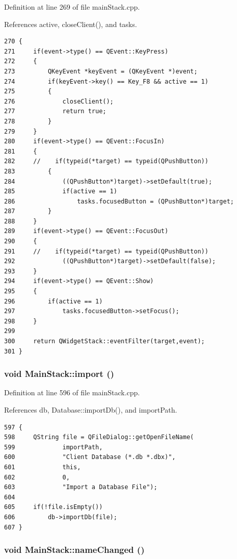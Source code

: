 Definition at line 269 of file main\-Stack.cpp.

References active, close\-Client(), and tasks.

\footnotesize\begin{verbatim}270 {
271     if(event->type() == QEvent::KeyPress)
272     {
273         QKeyEvent *keyEvent = (QKeyEvent *)event;
274         if(keyEvent->key() == Key_F8 && active == 1)
275         {
276             closeClient();
277             return true;
278         }
279     }
280     if(event->type() == QEvent::FocusIn)
281     {
282     //    if(typeid(*target) == typeid(QPushButton))
283         {
284             ((QPushButton*)target)->setDefault(true);
285             if(active == 1)
286                 tasks.focusedButton = (QPushButton*)target;
287         }
288     }
289     if(event->type() == QEvent::FocusOut)
290     {
291     //    if(typeid(*target) == typeid(QPushButton))
292             ((QPushButton*)target)->setDefault(false);
293     }
294     if(event->type() == QEvent::Show)
295     {
296         if(active == 1)
297             tasks.focusedButton->setFocus();
298     }
299     
300     return QWidgetStack::eventFilter(target,event);
301 }
\end{verbatim}\normalsize 


\hypertarget{classMainStack_k6}{
\subsubsection[import]{\setlength{\rightskip}{0pt plus 5cm}void Main\-Stack::import ()}}
\label{classMainStack_k6}


Definition at line 596 of file main\-Stack.cpp.

References db, Database::import\-Db(), and import\-Path.

\footnotesize\begin{verbatim}597 {
598     QString file = QFileDialog::getOpenFileName(
599             importPath,
600             "Client Database (*.db *.dbx)",
601             this,
602             0,
603             "Import a Database File");
604 
605     if(!file.isEmpty())
606         db->importDb(file);
607 }
\end{verbatim}\normalsize 


\hypertarget{classMainStack_l5}{
\subsubsection[nameChanged]{\setlength{\rightskip}{0pt plus 5cm}void Main\-Stack::name\-Changed ()}}
\label{classMainStack_l5}




